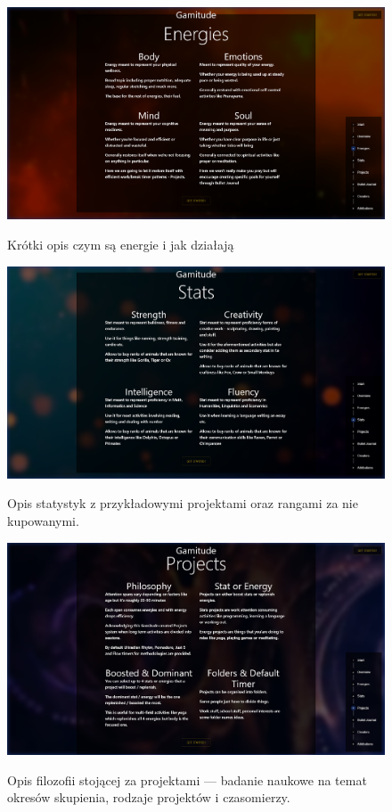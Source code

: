 \documentclass[a4paper,11pt]{report}
\begin{document}
\begin{figure}[H]
	\centering
	\includegraphics[scale=0.3]{prezentacja/Homepage_Energies}\\
	\caption{Krótki opis czym są energie i jak działają}
	\label{fig:homepage_energies}
\end{figure}
\begin{figure}[H]
	\centering
	\includegraphics[scale=0.3]{prezentacja/Homepage_Stats}\\
	\caption{Opis statystyk z przykładowymi projektami oraz rangami za nie kupowanymi.}
	\label{fig:homepage_stats}
\end{figure}
\begin{figure}[H]
	\centering
	\includegraphics[scale=0.3]{prezentacja/Homepage_Projects}\\
	\caption{Opis filozofii stojącej za projektami — badanie naukowe na temat okresów skupienia, rodzaje projektów i czasomierzy.}
	\label{fig:homepage_projects}
\end{figure}
\end{document}
